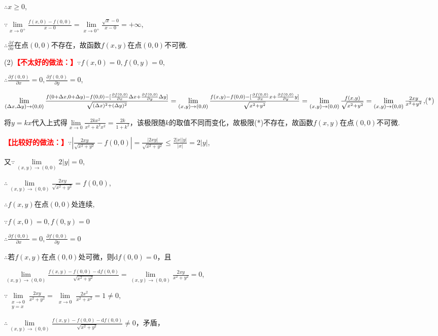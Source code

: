 \documentclass[12pt,UTF8]{ctexart}
\newcommand\LIM[2]{\lim\limits_{#1\rightarrow#2}}
\begin{document}
\begin{enumerate}
$\therefore x\geq0$,

$\because\lim\limits_{x\rightarrow0^+}\frac{f(x,0)-f(0,0)}{x-0}=\lim\limits_{x\rightarrow0^+}\frac{\sqrt x-0}{x-0}=+\infty$,

$\therefore\frac{\partial f}{\partial x}$在点$(0,0)$不存在，故函数$f(x,y)$在点$(0,0)$不可微.

(2)\textcolor{red}{\bf【不太好的做法：】}$\because f(x,0)=0,f(0,y)=0$,

$\therefore\frac{\partial f(0,0)}{\partial x}=0,\frac{\partial f(0,0)}{\partial y}=0$,

$\lim\limits_{(\Delta x,\Delta y)\rightarrow(0,0)}\frac{f(0+\Delta x,0+\Delta y)-f(0,0)-[\frac{\partial f(0,0)}{\partial x}\Delta x+\frac{\partial f(0,0)}{\partial y}\Delta y]}{\sqrt{(\Delta x)^2+(\Delta y)^2}}\\
=\lim\limits_{(x,y)\rightarrow(0,0)}\frac{f(x,y)-f(0,0)-[\frac{\partial f(0,0)}{\partial x}x+\frac{\partial f(0,0)}{\partial y}y]}{\sqrt{x^2+y^2}}\\
=\lim\limits_{(x,y)\rightarrow(0,0)}\frac{f(x,y)}{\sqrt{x^2+y^2}}=\lim\limits_{(x,y)\rightarrow(0,0)}\frac{2xy}{x^2+y^2}$,(*)

将$y=kx$代入上式得$\lim\limits_{x\rightarrow0}\frac{2kx^2}{x^2+k^2x^2}=\frac{2k}{1+k^2}$，该极限随$k$的取值不同而变化，故极限(*)不存在，故函数$f(x,y)$在点$(0,0)$不可微.

\textcolor{red}{\bf【比较好的做法：】}$\because|\frac{2xy}{\sqrt{x^2+y^2}}-f(0,0)|=\frac{|2xy|}{\sqrt{x^2+y^2}}\leq\frac{2|x||y|}{|x|}=2|y|$,

又$\because\LIM{(x,y)}{(0,0)}2|y|=0$,

$\therefore\LIM{(x,y)}{(0,0)}\frac{2xy}{\sqrt{x^2+y^2}}=f(0,0)$,

$\therefore f(x,y)$在点$(0,0)$处连续,

$\because f(x,0)=0,f(0,y)=0$

$\therefore\frac{\partial f(0,0)}{\partial x}=0,\frac{\partial f(0,0)}{\partial y}=0$

$\therefore$若$f(x,y)$在点$(0,0)$处可微，则$\mathrm df(0,0)=0$，且

$\LIM{(x,y)}{(0,0)}\frac{f(x,y)-f(0,0)-\mathrm df(0,0)}{\sqrt{x^2+y^2}}=\LIM{(x,y)}{(0,0)}\frac{2xy}{x^2+y^2}=0$,

$\because\lim\limits_{\substack{x\rightarrow0\\ y=x}}\frac{2xy}{x^2+y^2}=\lim\limits_{\substack{x\rightarrow0}}\frac{2x^2}{x^2+x^2}=1\neq0$,

$\therefore\LIM{(x,y)}{(0,0)}\frac{f(x,y)-f(0,0)-\mathrm df(0,0)}{\sqrt{x^2+y^2}}\neq0$，矛盾，


\end{enumerate}
\end{document}
